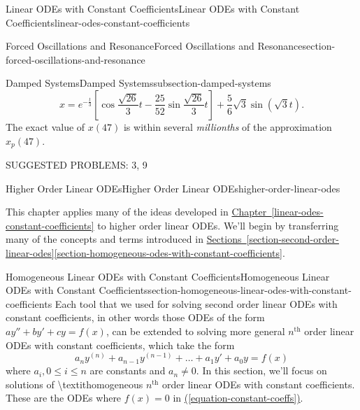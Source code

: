 \documentclass[oneside,10pt,]{book}
\numberwithin{equation}{section}
\renewcommand{\th}{\text{th}}
\begin{document}
\begin{chapterptx}{Linear ODEs with Constant Coefficients}{}{Linear ODEs with Constant Coefficients}{}{}{linear-odes-constant-coefficients}
\begin{sectionptx}{Forced Oscillations and Resonance}{}{Forced Oscillations and Resonance}{}{}{section-forced-oscillations-and-resonance}
\begin{subsectionptx}{Damped Systems}{}{Damped Systems}{}{}{subsection-damped-systems}
\begin{equation*}
x = e^{-\frac{t}{3}}\left[\cos\frac{\sqrt{26}}{3}t - \frac{25}{52}\sin\frac{\sqrt{26}}{3}t\right] + \frac{5}{6}\sqrt{3}\sin(\sqrt{3}t).
\end{equation*}
The exact value of \(x(47)\) is within several \emph{millionths} of the approximation \(x_{p}(47)\).%
\end{subsectionptx}
\begin{conclusion}{}%
\hypertarget{p-258}{}%
SUGGESTED PROBLEMS: 3, 9%
\end{conclusion}%
\end{sectionptx}
\end{chapterptx}
%
%
\typeout{************************************************}
\typeout{************************************************}
%
\begin{chapterptx}{Higher Order Linear ODEs}{}{Higher Order Linear ODEs}{}{}{higher-order-linear-odes}
\begin{introduction}{}%
\hypertarget{p-259}{}%
This chapter applies many of the ideas developed in \hyperref[linear-odes-constant-coefficients]{Chapter~\ref{linear-odes-constant-coefficients}} to higher order linear ODEs. We'll begin by transferring many of the concepts and terms introduced in \hyperref[section-second-order-linear-odes]{Sections~\ref{section-second-order-linear-odes}\textendash{}\ref{section-homogeneous-odes-with-constant-coefficients}}.%
\end{introduction}%
%
%
\typeout{************************************************}
\typeout{************************************************}
%
\begin{sectionptx}{Homogeneous Linear ODEs with Constant Coefficients}{}{Homogeneous Linear ODEs with Constant Coefficients}{}{}{section-homogeneous-linear-odes-with-constant-coefficients}
\hypertarget{p-260}{}%
Each tool that we used for solving second order linear ODEs with constant coefficients, in other words those ODEs of the form \(ay''+by'+cy=f(x)\), can be extended to solving more general \(n^{\text{th}}\) order linear ODEs with constant coefficients, which take the form%
\begin{equation}
a_{n}y^{(n)}+a_{n-1}y^{(n-1)}+\dots+a_{1}y'+a_{0}y=f(x)\label{equation-constant-coeffs}
\end{equation}
where \(a_{i},0\leq i\leq n\) are constants and \(a_{n}\neq0\). In this section, we'll focus on solutions of \textbackslash{}textit\textbraceleft{}homogeneous\textbraceright{} \(n^{\th}\) order linear ODEs with constant coefficients. These are the ODEs where \(f(x) = 0\) in \hyperref[equation-constant-coeffs]{(\ref{equation-constant-coeffs})}.%

\end{sectionptx}
\end{chapterptx}
\end{document}
